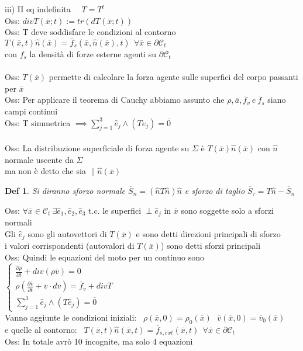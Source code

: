\documentclass{article}
\theoremstyle{unnumbered}
\newtheorem* {theoremT}{Def}
\theoremstyle{unnumbered1}
\newenvironment{defi}{\begin{gBox}\begin{theoremT}}{\end{theoremT}\end{gBox}}
\begin{document}
iii) II eq indefinita \ \ $T=T^t$\\
%
%
Oss: $divT(\overline{x};t):=tr(dT(\overline{x};t))$\\
%
Oss: T deve soddisfare le condizioni al contorno $T(\overline{x},t)\hat{n}(\overline{x})=\overline{f}_s(\overline{x},\hat{n}(\overline{x}),t) \ \ \forall\overline{x}\in\partial\mathcal{C}_t$ \\
\phantom{Oss: }con $f_s$ la densità di forze esterne agenti su $\partial\mathcal{C}_t$\\ \\
%
%
%
Oss: $T(\overline{x})$ permette di calcolare la forza agente sulle superfici del corpo passanti per $\overline{x}$\\
%
%
%
Oss: Per applicare il teorema di Cauchy abbiamo assunto che $\rho, \overline{a}, \overline{f}_v\ e\ \overline{f}_s$ siano campi continui\\
%
%
%
Oss: T simmetrica $\implies \sum_{j=1}^3\hat{e}_j\wedge(T\hat{e}_j)=\overline{0}$ \\ \\
%
%
Oss: La distribuzione superficiale di forza agente su $\Sigma$ è $T(\overline{x})\hat{n}(\overline{x})$ con $\hat{n}$ normale uscente da $\Sigma$ \\
%
\phantom{Oss: } ma non è detto che sia $\parallel \hat{n}(\overline{x})$
%
\begin{defi}
Si diranno sforzo normale $\overline{S}_n=(\hat{n}T\hat{n})\hat{n}$ e sforzo di taglio $\overline{S}_{\tau}=T\hat{n}-\overline{S}_n$
\end{defi}
%
%
Oss: $\forall \overline{x}\in\mathcal{C}_t \ \exists \hat{e}_1,\hat{e}_2,\hat{e}_3$ t.c. le superfici $\perp \hat{e}_j$ in $\overline{x}$ sono soggette solo a sforzi normali\\
\phantom{Oss: }Gli $\hat{e}_j$ sono gli autovettori di $T(\overline{x})$ e sono detti direzioni principali di sforzo\\ 
\phantom{Oss: }i valori corrispondenti (autovalori di $T(\overline{x})$) sono detti sforzi principali\\
%
%
%
Oss: Quindi le equazioni del moto per un continuo sono \ \ $\begin{cases}
\frac{\partial\rho}{\partial t} +div(\rho\overline{v})=0\\
\rho(\frac{\partial\overline{v}}{\partial t} + \overline{v}\cdot d\overline{v})=\overline{f}_v+divT\\
\sum_{j=1}^3\hat{e}_j\wedge(T\hat{e}_j)=\overline{0}
\end{cases}$\\
\phantom{Oss: }Vanno aggiunte le condizioni iniziali: \ $\rho(\overline{x},0)=\rho_0(\overline{x}) \ \ \ \overline{v}(\overline{x},0)=\overline{v}_0(\overline{x})$ \\
\phantom{Oss: }e quelle al contorno: \ $ T(\overline{x},t)\hat{n}(\overline{x},t)=\overline{f}_{s,ext}(\overline{x},t) \ \ \forall \overline{x}\in\partial\mathcal{C}_t$ \\
Oss: In totale avrò 10 incognite, ma solo 4 equazioni
\end{document}
